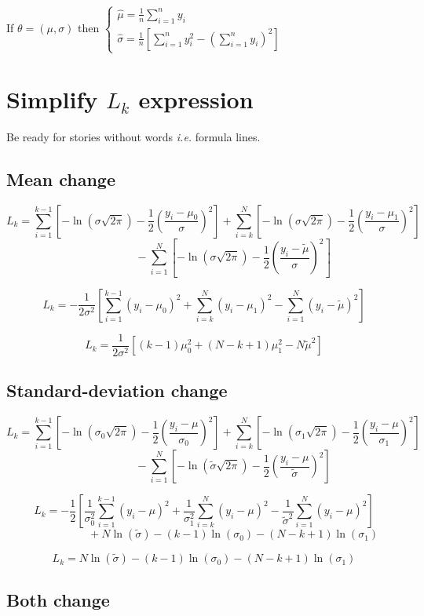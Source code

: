 \documentclass[11pt]{article}
\begin{document}
If $\theta=(\mu,\sigma)$ then $\begin{cases}\hat\mu=\frac 1n\sum_{i=1}^ny_i\\
\hat\sigma=\frac 1n\left[\sum_{i=1}^ny_i^2-(\sum_{i=1}^ny_i)^2\right]\end{cases}$

\section{Simplify $L_k$ expression}

Be ready for stories without words \emph{i.e.} formula lines.

\subsection{Mean change}

\[L_k=
\sum_{i=1}^{k-1}\left[-\ln(\sigma\sqrt{2\pi})-\frac 12\left(\frac{y_i-\mu_0}{\sigma}\right)^2\right]
+\sum_{i=k}^N\left[-\ln(\sigma\sqrt{2\pi})-\frac 12\left(\frac{y_i-\mu_1}{\sigma}\right)^2\right]\]
\[~~~~~~~~~~~~~~~~~~~~~~~~-\sum_{i=1}^N\left[-\ln(\sigma\sqrt{2\pi})-\frac 12\left(\frac{y_i-\tilde\mu}{\sigma}\right)^2\right]\]

\[L_k=
-\frac 1{2\sigma^2}\left[\sum_{i=1}^{k-1}(y_i-\mu_0)^2
+\sum_{i=k}^N(y_i-\mu_1)^2
-\sum_{i=1}^N(y_i-\tilde\mu)^2\right]\]

\[L_k=\frac 1{2\sigma^2}\left[(k-1)\mu_0^2+(N-k+1)\mu_1^2-N\tilde\mu^2\right]\]

\subsection{Standard-deviation change}

\[L_k=
\sum_{i=1}^{k-1}\left[-\ln(\sigma_0\sqrt{2\pi})-\frac 12\left(\frac{y_i-\mu}{\sigma_0}\right)^2\right]
+\sum_{i=k}^N\left[-\ln(\sigma_1\sqrt{2\pi})-\frac 12\left(\frac{y_i-\mu}{\sigma_1}\right)^2\right]\]
\[~~~~~~~~~~~~~~~~~~~~~~~~-\sum_{i=1}^N\left[-\ln(\tilde\sigma\sqrt{2\pi})-\frac 12\left(\frac{y_i-\mu}{\tilde\sigma}\right)^2\right]\]

\[L_k=
-\frac 12\left[\frac 1{\sigma_0^2}\sum_{i=1}^{k-1}(y_i-\mu)^2
+\frac 1{\sigma_1^2}\sum_{i=k}^N(y_i-\mu)^2
-\frac 1{\tilde\sigma^2}\sum_{i=1}^N(y_i-\mu)^2\right]\]
\[~~~~~~~~~~~~~~~~~~~~~~~~+N\ln(\tilde\sigma)-(k-1)\ln(\sigma_0)-(N-k+1)\ln(\sigma_1)\]

\[L_k=N\ln(\tilde\sigma)-(k-1)\ln(\sigma_0)-(N-k+1)\ln(\sigma_1)\]

\subsection{Both change}
\end{document}
